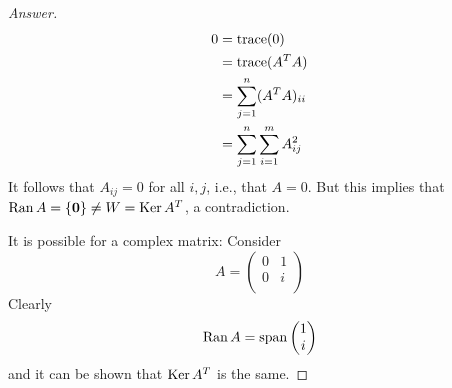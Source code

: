 \documentclass[../psets.tex]{subfiles}
\begin{document}
\begin{enumerate}[label={\textbf{7.\arabic*.}}]
\begin{proof}[Answer]
        \begin{align*}
            0 &= \operatorname{trace}(0)\\
            &= \operatorname{trace}(A^TA)\\
            &= \sum_{j=1}^n(A^TA)_{ii}\\
            &= \sum_{j=1}^n\sum_{i=1}^mA_{ij}^2
        \end{align*}
        It follows that $A_{ij}=0$ for all $i,j$, i.e., that $A=0$. But this implies that $\operatorname{Ran} A=\{\bm{0}\}\neq W=\operatorname{Ker} A^T$, a contradiction.\par
        It is possible for a complex matrix: Consider
        \begin{equation*}
            A =
            \begin{pmatrix}
                0 & 1\\
                0 & i\\
            \end{pmatrix}
        \end{equation*}
        Clearly
        \begin{equation*}
            \operatorname{Ran} A = \operatorname{span}
            \begin{pmatrix}
                1\\
                i\\
            \end{pmatrix}
        \end{equation*}
        and it can be shown that $\operatorname{Ker} A^T$ is the same.
    \end{proof}
\end{enumerate}
\end{document}

